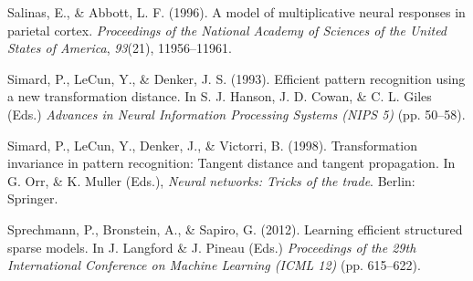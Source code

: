 \documentclass{article} %
\begin{document}
\begin{thebibliography}{100}
Salinas, E., \& Abbott, L. F. (1996). 
\newblock A model of multiplicative neural responses in parietal cortex. 
\newblock \emph{Proceedings of the National Academy of Sciences of the United States of America}, \emph{93}(21), 11956--11961.


Simard, P., LeCun, Y., \& Denker, J. S. (1993). 
\newblock Efficient pattern recognition using a new transformation distance. 
In S. J. Hanson, J. D. Cowan, \& C. L. Giles (Eds.) \emph{Advances in Neural Information Processing Systems (NIPS 5)} (pp. 50--58). %

Simard, P., LeCun, Y., Denker, J., \& Victorri, B. (1998). 
\newblock Transformation invariance in pattern recognition: Tangent distance and tangent propagation. 
\newblock In G. Orr,  \& K. Muller (Eds.), \emph{Neural networks: Tricks of the trade}. Berlin: Springer. 


Sprechmann, P., Bronstein, A., \& Sapiro, G. (2012).
\newblock Learning efficient structured sparse models.
\newblock In J. Langford \& J. Pineau (Eds.) \emph{Proceedings of the 29th International Conference on Machine Learning (ICML 12)} (pp. 615--622).


\end{thebibliography}
\end{document}
